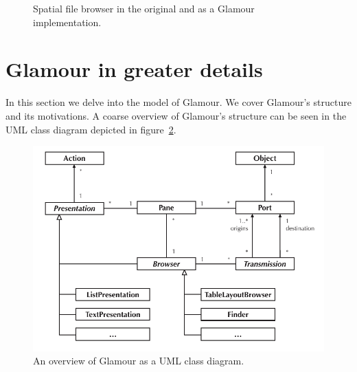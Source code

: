 \documentclass[a4paper,10pt,twoside]{book}
\begin{document}
\begin{figure}[tbp]
\begin{center}
\caption{Spatial file browser in the original and as a Glamour implementation.}
\label{fig:casestudies/file_window}
\end{center}
\end{figure}

\section{Glamour in greater details}

In this section we delve into the model of Glamour. We cover Glamour's
structure and its motivations. A coarse overview of Glamour's
structure can be seen in the UML class diagram depicted in
figure~\ref{fig:uml-overview}.

\begin{figure}[htbp]
\centerline{\includegraphics[width=\linewidth]{class_diagram.pdf}}
\caption{An overview of Glamour as a UML class diagram.}
\label{fig:uml-overview}
\end{figure}
\end{document}
